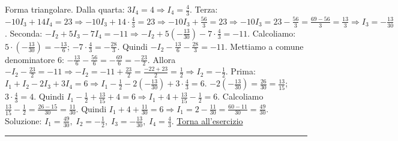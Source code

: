 Forma triangolare. Dalla quarta: \(3I_4 = 4 \Rightarrow I_4 = \frac{4}{3}\).
Terza: \(-10I_3 + 14I_4 = 23 \Rightarrow -10I_3 + 14\cdot\frac{4}{3} = 23 \Rightarrow -10I_3 + \frac{56}{3} = 23 \Rightarrow -10I_3 = 23 - \frac{56}{3} = \frac{69-56}{3} = \frac{13}{3} \Rightarrow I_3 = -\frac{13}{30}\).
Seconda: \(-I_2 + 5I_3 -7I_4 = -11 \Rightarrow -I_2 + 5(-\frac{13}{30}) -7\cdot\frac{4}{3} = -11\). Calcoliamo: \(5\cdot(-\frac{13}{30}) = -\frac{13}{6}\); \(-7\cdot\frac{4}{3} = -\frac{28}{3}\). Quindi \(-I_2 -\frac{13}{6} - \frac{28}{3} = -11\). Mettiamo a comune denominatore 6: \(-\frac{13}{6} - \frac{56}{6} = -\frac{69}{6} = -\frac{23}{2}\). Allora \(-I_2 - \frac{23}{2} = -11 \Rightarrow -I_2 = -11 + \frac{23}{2} = \frac{-22+23}{2} = \frac{1}{2} \Rightarrow I_2 = -\frac{1}{2}\).
Prima: \(I_1 + I_2 -2I_3 +3I_4 = 6 \Rightarrow I_1 -\frac{1}{2} -2(-\frac{13}{30}) +3\cdot\frac{4}{3} = 6\). \(-2(-\frac{13}{30}) = \frac{26}{30} = \frac{13}{15}\); \(3\cdot\frac{4}{3}=4\). Quindi \(I_1 -\frac{1}{2} + \frac{13}{15} + 4 = 6 \Rightarrow I_1 + 4 + \frac{13}{15} - \frac{1}{2} = 6\). Calcoliamo \(\frac{13}{15} - \frac{1}{2} = \frac{26-15}{30} = \frac{11}{30}\). Quindi \(I_1 + 4 + \frac{11}{30} = 6 \Rightarrow I_1 = 2 - \frac{11}{30} = \frac{60-11}{30} = \frac{49}{30}\).
Soluzione: \(\displaystyle I_1 = \frac{49}{30},\; I_2 = -\frac{1}{2},\; I_3 = -\frac{13}{30},\; I_4 = \frac{4}{3}\). \hfill \hyperlink{ex:12}{Torna all'esercizio}\\
\hrule
